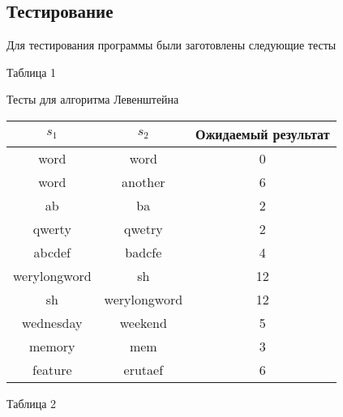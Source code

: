 \subsection{Тестирование}

Для тестирования программы были заготовлены следующие тесты

\hfill

\begin{flushright}
    Таблица 1
\end{flushright}

\begin{center}
    Тесты для алгоритма Левенштейна

    \begin{tabular}{|c|c|c|}
        \hline
        $s_1$ & $s_2$ & Ожидаемый результат \\
        \hline
        word & word & 0 \\
        \hline
        word & another & 6 \\
        \hline
        ab & ba & 2 \\
        \hline
        qwerty & qwetry & 2 \\
        \hline
        abcdef & badcfe & 4 \\
        \hline
        werylongword & sh & 12 \\
        \hline
        sh & werylongword & 12 \\
        \hline
        wednesday & weekend & 5 \\
        \hline
        memory & mem & 3 \\
        \hline
        feature & erutaef & 6 \\
        \hline
    \end{tabular}
\end{center}

\hfill

\begin{flushright}
    Таблица 2
\end{flushright}


